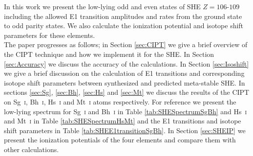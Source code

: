 \documentclass[8pt,a4paper, twoside]{report}
\begin{document}
In this work we present the low-lying odd and even states of SHE $Z=106$-$109$ including the allowed E1 transition amplitudes and rates from the ground state to odd parity states. We also calculate the ionization potential and isotope shift parameters for these elements.\\

The paper progresses as follows; in Section \ref{sec:CIPT} we give a brief overview of the CIPT technique and how we implement it for the SHE. In Section \ref{sec:Accuracy} we discuss the accuracy of the calculations. In Section \ref{sec:Isoshift} we give a brief discussion on the calculation of E1 transitions and corresponding isotope shift parameters between synthesized and predicted meta-stable SHE. In sections  \ref{sec:Sg}, \ref{sec:Bh}, \ref{sec:Hs} and \ref{sec:Mt} we discuss the results of the CIPT on  Sg~\textsc{i}, Bh~\textsc{i}, Hs~\textsc{i} and Mt~\textsc{i} atoms respectively.  For reference we present the low-lying spectrum for Sg~\textsc{i} and Bh~\textsc{i} in Table \ref{tab:SHESpectrumSgBh} and Hs~\textsc{i} and Mt~\textsc{i} in Table \ref{tab:SHESpectrumHsMt}  and the E1 transitions and isotope shift parameters in  Table \ref{tab:SHEE1transitionSgBh}. In Section \ref{sec:SHEIP} we present the ionization potentials of the four elements and compare them with other calculations. 
\end{document}
